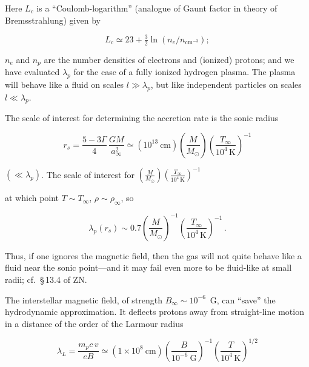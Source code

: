 \documentclass[aps,prd,twocolumn,superscriptaddress,nofootinbib]{revtex4-2}
\begin{document}
Here $L_c$ is a ``Coulomb-logarithm'' (analogue of Gaunt factor in theory of
Bremsstrahlung) given by

\begin{equation}
L_c \simeq 23 + \tfrac{3}{2}\ln (n_e/n_{\text{cm}^{-3}});
\tag{4.6.2}
\end{equation}

$n_e$ and $n_p$ are the number densities of electrons and (ionized) protons; and we
have evaluated $\lambda_p$ for the case of a fully ionized hydrogen plasma.  The plasma
will behave like a fluid on scales $l \gg \lambda_p$, but like independent particles on scales
$l \ll \lambda_p$.

The scale of interest for determining the accretion rate is the sonic radius

\begin{equation}
r_s = \frac{5 - 3\Gamma}{4}\,\frac{GM}{a_\infty^2}
\simeq (10^{13}~\text{cm})\left(\frac{M}{M_\odot}\right)
\left(\frac{T_\infty}{10^4\,\text{K}}\right)^{-1}
\tag{4.6.3}
\end{equation}

$(\ll \lambda_p)$.  The scale of interest for $\left(\frac{M}{M_\odot}\right)\left(\frac{T_\infty}{10^4\,\text{K}}\right)^{-1}$

at which point $T \sim T_\infty$, $\rho \sim \rho_\infty$, so

\begin{equation}
\lambda_p(r_s) \sim 0.7 \left(\frac{M}{M_\odot}\right)^{-1}
\left(\frac{T_\infty}{10^4\,\text{K}}\right)^{-1}\,.
\tag{4.6.4}
\end{equation}


Thus, if one ignores the magnetic field, then the gas will not quite behave like a
fluid near the sonic point---and it may fail even more to be fluid-like at small
radii; cf.\ \S\,13.4 of ZN.

The interstellar magnetic field, of strength $B_\infty \sim 10^{-6}$~G, can ``save'' the
hydrodynamic approximation.  It deflects protons away from straight-line
motion in a distance of the order of the Larmour radius

\begin{equation}
\lambda_L = \frac{m_p c\,v}{eB}
\simeq (1 \times 10^{8}~\text{cm})
\left(\frac{B}{10^{-6}~\text{G}}\right)^{-1}
\left(\frac{T}{10^4\,\text{K}}\right)^{1/2}
\tag{4.6.5}
\end{equation}
\end{document}
